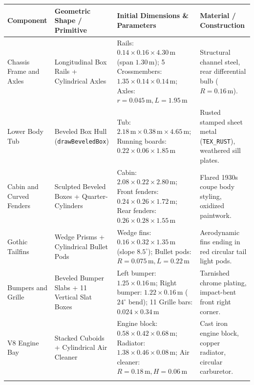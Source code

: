 \documentclass[10pt,a4paper,oneside]{article}
\begin{document}
\begin{longtable}{>{\raggedright\arraybackslash}p{}>{\raggedright\arraybackslash}p{}>{\raggedright\arraybackslash}p{}>{\raggedright\arraybackslash}p{}}
\toprule
\textbf{Component} & \textbf{Geometric Shape / Primitive} & \textbf{Initial Dimensions \& Parameters} & \textbf{Material / Construction} \\
\midrule
\endhead

Chassis Frame and Axles & Longitudinal Box Rails + Cylindrical Axles & 2 Rails: $0.14\times 0.16\times 4.30\,\mathrm{m}$ (span $1.30\,\mathrm{m}$); 5 Crossmembers: $1.35\times 0.14\times 0.14\,\mathrm{m}$; Axles: $r=0.045\,\mathrm{m}, L=1.95\,\mathrm{m}$ & Structural channel steel, rear differential bulb ($R=0.16\,\mathrm{m}$).\\\addlinespace[3pt]

Lower Body Tub & Beveled Box Hull (\texttt{drawBeveledBox}) & Tub: $2.18\,\mathrm{m} \times 0.38\,\mathrm{m} \times 4.65\,\mathrm{m}$; Running boards: $0.22\times 0.06\times 1.85\,\mathrm{m}$ & Rusted stamped sheet metal (\texttt{TEX\_RUST}), weathered sill plates.\\\addlinespace[3pt]

Cabin and Curved Fenders & Sculpted Beveled Boxes + Quarter-Cylinders & Cabin: $2.08\times 0.22\times 2.80\,\mathrm{m}$; Front fenders: $0.24\times 0.26\times 1.72\,\mathrm{m}$; Rear fenders: $0.26\times 0.28\times 1.55\,\mathrm{m}$ & Flared 1930s coupe body styling, oxidized paintwork.\\\addlinespace[3pt]

Gothic Tailfins & Wedge Prisms + Cylindrical Bullet Pods & Wedge fins: $0.16\times 0.32\times 1.35\,\mathrm{m}$ (slope $8.5^\circ$); Bullet pods: $R=0.075\,\mathrm{m}, L=0.22\,\mathrm{m}$ & Aerodynamic fins ending in red circular tail light pods.\\\addlinespace[3pt]

Bumpers and Grille & Beveled Bumper Slabs + 11 Vertical Slat Boxes & Left bumper: $1.25\times 0.16\,\mathrm{m}$; Right bumper: $1.22\times 0.16\,\mathrm{m}$ ($24^\circ$ bend); 11 Grille bars: $0.024\times 0.34\,\mathrm{m}$ & Tarnished chrome plating, impact-bent front right corner.\\\addlinespace[3pt]

V8 Engine Bay & Stacked Cuboids + Cylindrical Air Cleaner & Engine block: $0.58\times 0.42\times 0.68\,\mathrm{m}$; Radiator: $1.38\times 0.46\times 0.08\,\mathrm{m}$; Air cleaner: $R=0.18\,\mathrm{m}, H=0.06\,\mathrm{m}$ & Cast iron engine block, copper radiator, circular carburetor.\\\addlinespace[3pt]


\end{longtable}
\end{document}
